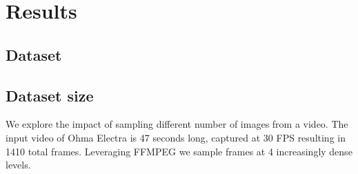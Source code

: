\chapter{Results}

\begin{comment}

Experiments:
- Explore the impact of capturing
    - Capturing NeRFs in different ways
        - Walking, standing still, sparsely, densely, linearly, around an object
    - Capturing video, images, polycam
        - Better/worse quality with polycam or COLMAP
    - Capturing different kind of scenes
        - Bounded/Unbounded
    - Capturing in different conditions
    - Capturing 
    
- Explore the impact of dataset size
    - Extract different amounts of images from the video
        - Simulate driving by walking up and back a street multiple times
    - How much data is required until COLMAP becomes a bottleneck

- Explore the impact of area-size
    - Remember to point out that area is poorly defined since scale is perspective relative, depending on the level of detail you want.
    - Area must be defined for a certain scene type. E.g. street view, aerial view, unbounded in multiple directions, bounded in all directions

- Explore the impact of different methods
    - instant-npg, nerfacto, NeRF

Metrics
- Quantitative
    - PSNR, LPIPS, SSIM
- Qualitative
    - Compare images side-by-side



Research questions:
- To what extent does a good capture impact the result of a NeRF
- How much data is required until COLMAP becomes a bottleneck?
- What is the capacity of a NeRF when optimizing a street view scene?

SCENES:
- Bounded scene
- Unbounded scene
- Walking
- Standing still
- Street-view

\end{comment}



\section{Dataset}





\section{Dataset size}
We explore the impact of sampling different number of images from a video. The input video of Ohma Electra \cite{data:object-unbounded-ohma} is 47 seconds long, captured at 30 FPS resulting in 1410 total frames. Leveraging FFMPEG we sample frames at 4 increasingly dense levels.


